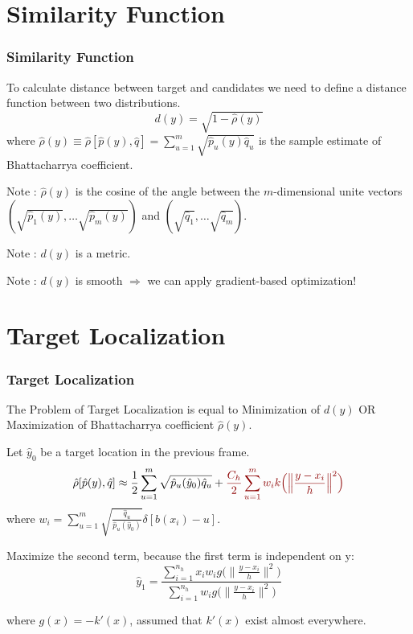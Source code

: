 \documentclass[hyperref={pdfpagelabels=false}]{beamer}
\begin{document}

\section{Similarity Function}
\begin{frame}
\frametitle{Similarity Function}
To calculate distance between target and candidates we need to define {\color{darkred} a distance function between two distributions}.
\pause
	$$d(y) = \sqrt{1-\hat{\rho}(y)}$$
where $\hat{\rho}(y) \equiv \hat{\rho}[\hat{p}(y), \hat{q}] = \sum_{u=1}^{m}\sqrt{\hat{p}_u(y) \hat{q}_u}$ is the sample estimate of {\color{darkred} Bhattacharrya coefficient}.

\pause
{\color{darkred} Note} : $\hat{\rho}(y)$ is the cosine of the angle between the $m$-dimensional unite vectors $(\sqrt{\hat{p}_1(y)},\dots \sqrt{\hat{p}_m(y)})$ and $(\sqrt{\hat{q}_1},\dots \sqrt{\hat{q}_m})$. 

\pause
{\color{darkred} Note} : $d(y)$ is a metric.

\pause
{\color{darkred} Note} : $d(y)$ is smooth $\Rightarrow$ we can apply  gradient-based optimization!

\end{frame}


\section{Target Localization}
\begin{frame}
\frametitle{Target Localization}
\small
The Problem of Target Localization is equal to {\color{darkred} Minimization of $d(y)$} OR {\color{darkred} Maximization of Bhattacharrya coefficient} $\hat{\rho}(y)$.

\vspace{5pt}
Let $\hat{y}_0$ be a target location in the previous frame. 
$$\hat{\rho}[\hat{p}(y), \hat{q}] \approx \frac{1}{2}\sum_{u=1}^{m}\sqrt{\hat{p}_u(\hat{y}_0) \hat{q}_u}+\color{darkred}\frac{C_h}{2}\sum_{u=1}^{m}w_i k\Big(\Big\lVert\frac{ y-x_i}{h}\Big\rVert^2\Big)$$
where $w_i = \sum_{u=1}^{m}\sqrt{\frac{\hat{q}_u}{\hat{p}_u(\hat{y}_0)}}\delta[b(x_i)-u]$.

Maximize the second term, because the first term is independent on y:
$$\hat{y}_1 = \frac{\sum_{i=1}^{n_h}x_iw_ig\Big(\Big\lVert\frac{ y-x_i}{h}\Big\rVert^2\Big)}{\sum_{i=1}^{n_h}w_ig\Big(\Big\lVert\frac{ y-x_i}{h}\Big\rVert^2\Big)}$$

where $g(x) = -k'(x)$, assumed that $k'(x)$ exist almost everywhere.

\end{frame}
\end{document}
